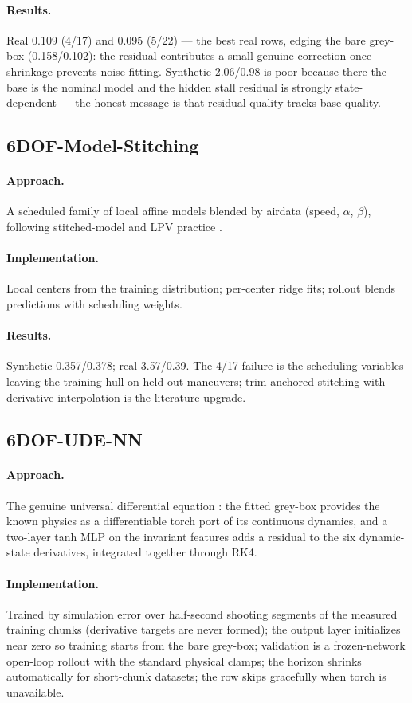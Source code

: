 \documentclass[11pt]{article}
\begin{document}
\paragraph{Results.} Real 0.109 (4/17) and 0.095 (5/22) --- the best real
rows, edging the bare grey-box (0.158/0.102): the residual contributes a
small genuine correction once shrinkage prevents noise fitting. Synthetic
2.06/0.98 is poor because there the base is the nominal model and the
hidden stall residual is strongly state-dependent --- the honest message is
that residual quality tracks base quality.

\subsection{6DOF-Model-Stitching}
\paragraph{Approach.} A scheduled family of local affine models blended by
airdata (speed, $\alpha$, $\beta$), following stitched-model and LPV
practice \cite{Tischler1995SystemIM,toth2010lpv}.
\paragraph{Implementation.} Local centers from the training distribution;
per-center ridge fits; rollout blends predictions with scheduling weights.
\paragraph{Results.} Synthetic 0.357/0.378; real 3.57/0.39. The 4/17
failure is the scheduling variables leaving the training hull on held-out
maneuvers; trim-anchored stitching with derivative interpolation is the
literature upgrade.

\subsection{6DOF-UDE-NN}
\paragraph{Approach.} The genuine universal differential equation
\cite{rackauckas2020universal}: the fitted grey-box provides the known
physics as a differentiable torch port of its continuous dynamics, and a
two-layer tanh MLP on the invariant features adds a residual to the six
dynamic-state derivatives, integrated together through RK4.
\paragraph{Implementation.} Trained by simulation error over half-second
shooting segments of the measured training chunks (derivative targets are
never formed); the output layer initializes near zero so training starts
from the bare grey-box; validation is a frozen-network open-loop rollout
with the standard physical clamps; the horizon shrinks automatically for
short-chunk datasets; the row skips gracefully when torch is unavailable.
\end{document}
